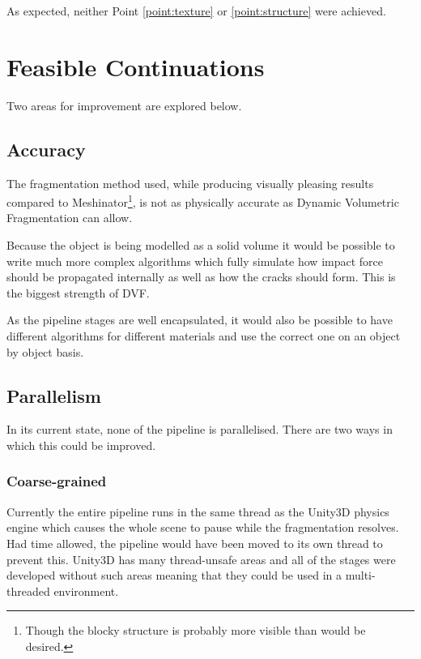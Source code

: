As expected, neither Point \ref{point:texture} or \ref{point:structure} were achieved.

\section{Feasible Continuations}

\label{sect:cont}

Two areas for improvement are explored below.

\subsection{Accuracy}

\label{sect:accurate}

The fragmentation method used, while producing visually pleasing results compared to Meshinator\footnote{Though the blocky structure is probably more visible than would be desired.}, is not as physically accurate as Dynamic Volumetric Fragmentation can allow.

Because the object is being modelled as a solid volume it would be possible to write much more complex algorithms which fully simulate how impact force should be propagated internally as well as how the cracks should form. This is the biggest strength of DVF.

As the pipeline stages are well encapsulated, it would also be possible to have different algorithms for different materials and use the correct one on an object by object basis.

\subsection{Parallelism}

\label{sect:multi}

In its current state, none of the pipeline is parallelised. There are two ways in which this could be improved.

\subsubsection{Coarse-grained}

Currently the entire pipeline runs in the same thread as the Unity3D physics engine which causes the whole scene to pause while the fragmentation resolves. Had time allowed, the pipeline would have been moved to its own thread to prevent this. Unity3D has many thread-unsafe areas and all of the stages were developed without such areas meaning that they could be used in a multi-threaded environment.

